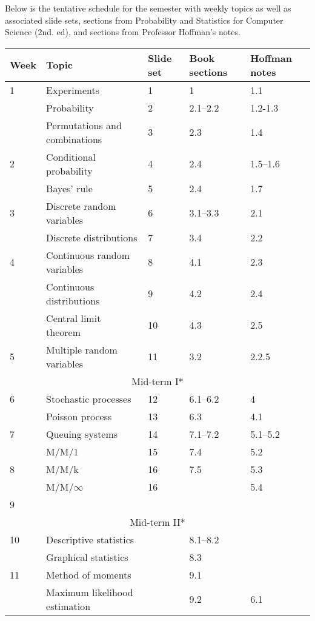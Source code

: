 \documentclass[10pt]{article}
\begin{document}
\pagestyle{fancy} 

Below is the tentative schedule for the semester with weekly topics as well as associated slide sets, sections from Probability and Statistics for Computer Science (2nd. ed), and sections from Professor Hoffman's notes.

\begin{center}
\begin{tabular}{|l|l|l|l|l|}
\hline
Week & Topic & Slide set & Book sections & Hoffman notes \\
\hline
1 & Experiments & 1 & 1 & 1.1 \\
& Probability & 2  & 2.1--2.2 & 1.2-1.3 \\
& Permutations and combinations & 3 & 2.3 & 1.4 \\
\hline
2 & Conditional probability & 4 & 2.4 & 1.5--1.6 \\
& Bayes' rule & 5 & 2.4 & 1.7 \\
\hline
3 & Discrete random variables & 6 & 3.1--3.3 & 2.1\\
& Discrete distributions & 7 & 3.4 & 2.2 \\
\hline
4 & Continuous random variables & 8 & 4.1 & 2.3 \\
& Continuous distributions & 9 & 4.2 & 2.4 \\
& Central limit theorem & 10 & 4.3 & 2.5 \\
\hline 
5 & Multiple random variables & 11 & 3.2 & 2.2.5 \\
\hline
\hline
\multicolumn{5}{|c|}{Mid-term I*} \\
\hline
\hline
6 & Stochastic processes & 12 & 6.1--6.2 & 4 \\
& Poisson process & 13 & 6.3 & 4.1 \\
\hline
7 & Queuing systems & 14 & 7.1--7.2 & 5.1--5.2 \\
 & M/M/1 & 15 & 7.4 & 5.2 \\
\hline
8 & M/M/k & 16 & 7.5 & 5.3 \\
& M/M/$\infty$ & 16 &  & 5.4 \\
\hline
9 &  &  & & \\
\hline
\hline
\multicolumn{5}{|c|}{Mid-term II*} \\
\hline
\hline
10 & Descriptive statistics &  & 8.1--8.2 & \\
& Graphical statistics &  & 8.3 & \\
\hline 
11 & Method of moments &  & 9.1 & \\
& Maximum likelihood estimation &  & 9.2 & 6.1 \\

\end{tabular}
\end{center}
\end{document}
